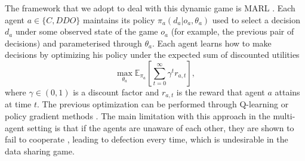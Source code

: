



The framework that we adopt to deal with this 
dynamic game is MARL 
\cite{marl_over}. Each agent $a \in \lbrace C, DDO \rbrace $ maintains its policy $\pi_a(d_a|o_a, \theta_a)$ used to select a decision $d_a$ under some observed state of the game $o_a$ (for example, the previous pair of decisions) and parameterised through 
 $\theta_a$. Each agent learns
how to make decisions by optimizing his policy under the expected sum of discounted utilities
$$
\max_{\theta_a} \mathbb{E}_{\pi_a} \left[ \sum_{t=0}^\infty \gamma^t r_{a, t} \right],
$$
where $\gamma \in (0,1)$ is a discount factor and $r_{a,t}$ is the reward that
agent $a$ attains at time $t$.
The previous optimization can be performed through 
Q-learning or policy gradient methods \cite{sutton2012reinforcement}. 
The main limitation with this approach in the multi-agent setting is that if the
agents are unaware of each other, they are shown to fail to cooperate 
\cite{gallego2019opponent}, leading to defection every time, which is undesirable in the data sharing  game.

